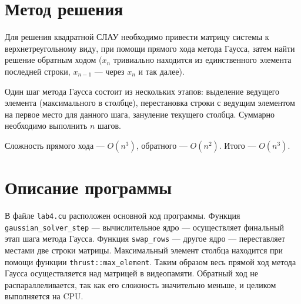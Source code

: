 \section{Метод решения}
Для решения квадратной СЛАУ необходимо привести матрицу системы к верхнетреугольному виду, при помощи прямого хода метода Гаусса, затем найти решение обратным ходом ($x_n$ тривиально находится из единственного элемента последней строки, $x_{n-1}$ --- через $x_n$ и так далее).

Один шаг метода Гаусса состоит из нескольких этапов: выделение ведущего элемента (максимального в столбце), перестановка строки с ведущим элементом на первое место для данного шага, зануление текущего столбца. Суммарно необходимо выполнить $n$ шагов.

Сложность прямого хода --- $O(n^3)$, обратного --- $O(n^2)$. Итого --- $O(n^3)$.

\section{Описание программы}
В файле \texttt{lab4.cu} расположен основной код программы. Функция \texttt{gaussian\_solver\_step} --- вычислительное ядро --- осуществляет финальный этап шага метода Гаусса. Функция \texttt{swap\_rows} --- другое ядро --- переставляет местами две строки матрицы. Максимальный элемент столбца находится при помощи функции \texttt{thrust::max\_element}. Таким образом весь прямой ход метода Гаусса осуществляется над матрицей в видеопамяти. Обратный ход не распараллеливается, так как его сложность значительно меньше, и целиком выполняется на CPU.
